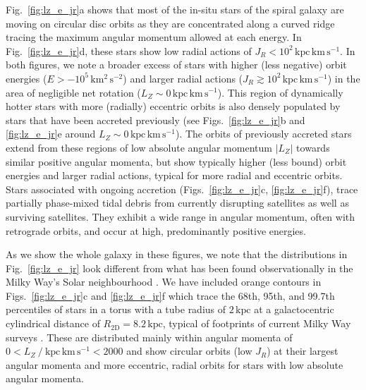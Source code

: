 \documentclass[fleqn,usenatbib]{mnras}
\begin{document}
Fig.~\ref{fig:lz_e_jr}a shows that most of the in-situ stars of the spiral galaxy are moving on circular disc orbits as they are concentrated along a curved ridge tracing the maximum angular momentum allowed at each energy. In Fig.~\ref{fig:lz_e_jr}d, these stars show low radial actions of $J_R < 10^2\,\mathrm{kpc\,km\,s^{-1}}$. In both figures, we note a broader excess of stars with higher (less negative) orbit energies ($E > -10^5\,\mathrm{km^2\,s^{-2}}$) and larger radial actions ($J_R \gtrsim 10^2\,\mathrm{kpc\,km\,s^{-1}}$) in the area of negligible net rotation ($L_Z \sim 0\,\mathrm{kpc\,km\,s^{-1}}$). This region of dynamically hotter stars with more (radially) eccentric orbits is also densely populated by stars that have been accreted previously (see Figs.~\ref{fig:lz_e_jr}b and \ref{fig:lz_e_jr}e around $L_Z \sim 0\,\mathrm{kpc\,km\,s^{-1}}$). The orbits of previously accreted stars extend from these regions of low absolute angular momentum $\vert L_Z\vert$ towards similar positive angular momenta, but show typically higher (less bound) orbit energies and larger radial actions, typical for more radial and eccentric orbits. Stars associated with ongoing accretion (Figs.~\ref{fig:lz_e_jr}c, \ref{fig:lz_e_jr}f), trace partially phase-mixed tidal debris from currently disrupting satellites as well as surviving satellites. They exhibit a wide range in angular momentum, often with retrograde orbits, and occur at high, predominantly positive energies.

As we show the whole galaxy in these figures, we note that the distributions in Fig.~\ref{fig:lz_e_jr} look different from what has been found observationally in the Milky Way's Solar neighbourhood \citep[see for example][]{Helmi2018,Trick2019,Das2020,Buder2022}. We have included orange contours in Figs.~\ref{fig:lz_e_jr}c and \ref{fig:lz_e_jr}f which trace the 68th, 95th, and 99.7th percentiles of stars in a torus with a tube radius of $2\,\mathrm{kpc}$ at a galactocentric cylindrical distance of $R_\mathrm{2D} = 8.2\,\mathrm{kpc}$, typical of footprints of current Milky Way surveys \citep[for example][]{SDSSDR17, Katz2023, Buder2025}. These are distributed mainly within angular momenta of $0 < L_Z~/~\mathrm{kpc\,km\,s^{-1}} < 2000$ and show circular orbits (low $J_R$) at their largest angular momenta and more eccentric, radial orbits for stars with low absolute angular momenta.
\end{document}
